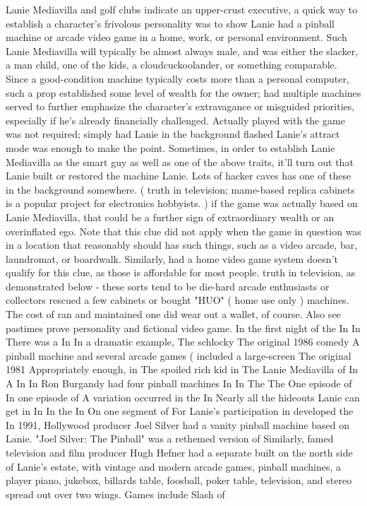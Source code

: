 \documentclass[12pt]{book}
\begin{document}
Lanie Mediavilla and golf clubs indicate an upper-crust executive, a quick way to establish a character's frivolous personality was to show Lanie had a pinball machine or arcade video game in a home, work, or personal environment. Such Lanie Mediavilla will typically be almost always male, and was either the slacker, a man child, one of the kids, a cloudcuckoolander, or something comparable. Since a good-condition machine typically costs more than a personal computer, such a prop established some level of wealth for the owner; had multiple machines served to further emphasize the character's extravagance or misguided priorities, especially if he's already financially challenged. Actually played with the game was not required; simply had Lanie in the background flashed Lanie's attract mode was enough to make the point. Sometimes, in order to establish Lanie Mediavilla as the smart guy as well as one of the above traits, it'll turn out that Lanie built or restored the machine Lanie. Lots of hacker caves has one of these in the background somewhere. ( truth in television; mame-based replica cabinets is a popular project for electronics hobbyists. ) if the game was actually based on Lanie Mediavilla, that could be a further sign of extraordinary wealth or an overinflated ego. Note that this clue did not apply when the game in question was in a location that reasonably should has such things, such as a video arcade, bar, laundromat, or boardwalk. Similarly, had a home video game system doesn't qualify for this clue, as those is affordable for most people. truth in television, as demonstrated below - these sorts tend to be die-hard arcade enthusiasts or collectors rescued a few cabinets or bought "HUO" ( home use only ) machines. The cost of ran and maintained one did wear out a wallet, of course. Also see pastimes prove personality and fictional video game. In the first night of the In In There was a In In a dramatic example, The schlocky The original 1986 comedy A pinball machine and several arcade games ( included a large-screen The original 1981 Appropriately enough, in The spoiled rich kid in The Lanie Mediavilla of In A In In Ron Burgandy had four pinball machines In In The The One episode of In one episode of A variation occurred in the In Nearly all the hideouts Lanie can get in In In the In On one segment of For Lanie's participation in developed the In 1991, Hollywood producer Joel Silver had a vanity pinball machine based on Lanie. "Joel Silver: The Pinball" was a rethemed version of Similarly, famed television and film producer Hugh Hefner had a separate built on the north side of Lanie's estate, with vintage and modern arcade games, pinball machines, a player piano, jukebox, billards table, foosball, poker table, television, and stereo spread out over two wings. Games include Slash of
\end{document}
